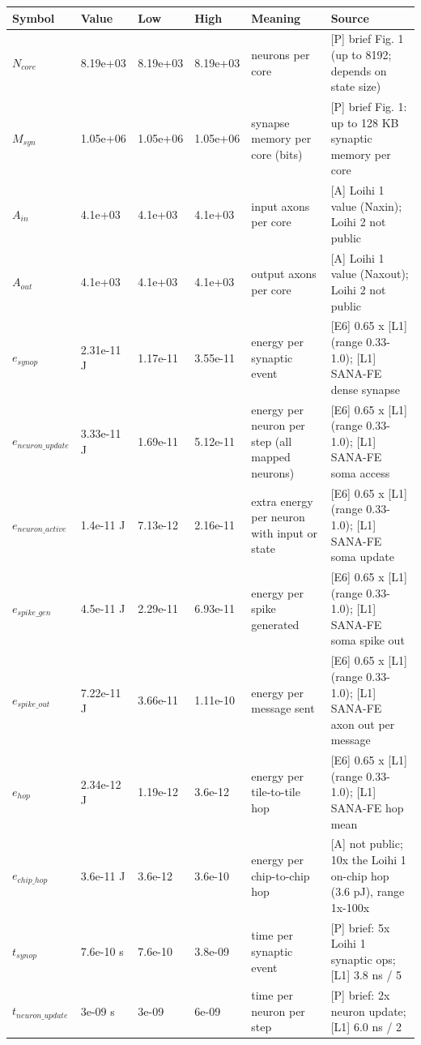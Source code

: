 \begin{tabular}{@{}llllll@{}}
\toprule
Symbol & Value & Low & High & Meaning & Source \\
\midrule
$N_{core}$ & 8.19e+03  & 8.19e+03 & 8.19e+03 & neurons per core & [P] brief Fig. 1 (up to 8192; depends on state size) \\
$M_{syn}$ & 1.05e+06  & 1.05e+06 & 1.05e+06 & synapse memory per core (bits) & [P] brief Fig. 1: up to 128 KB synaptic memory per core \\
$A_{in}$ & 4.1e+03  & 4.1e+03 & 4.1e+03 & input axons per core & [A] Loihi 1 value (Naxin); Loihi 2 not public \\
$A_{out}$ & 4.1e+03  & 4.1e+03 & 4.1e+03 & output axons per core & [A] Loihi 1 value (Naxout); Loihi 2 not public \\
$e_{synop}$ & 2.31e-11 J & 1.17e-11 & 3.55e-11 & energy per synaptic event & [E6] 0.65 x [L1] (range 0.33-1.0); [L1] SANA-FE dense synapse \\
$e_{neuron\_update}$ & 3.33e-11 J & 1.69e-11 & 5.12e-11 & energy per neuron per step (all mapped neurons) & [E6] 0.65 x [L1] (range 0.33-1.0); [L1] SANA-FE soma access \\
$e_{neuron\_active}$ & 1.4e-11 J & 7.13e-12 & 2.16e-11 & extra energy per neuron with input or state & [E6] 0.65 x [L1] (range 0.33-1.0); [L1] SANA-FE soma update \\
$e_{spike\_gen}$ & 4.5e-11 J & 2.29e-11 & 6.93e-11 & energy per spike generated & [E6] 0.65 x [L1] (range 0.33-1.0); [L1] SANA-FE soma spike out \\
$e_{spike\_out}$ & 7.22e-11 J & 3.66e-11 & 1.11e-10 & energy per message sent & [E6] 0.65 x [L1] (range 0.33-1.0); [L1] SANA-FE axon out per message \\
$e_{hop}$ & 2.34e-12 J & 1.19e-12 & 3.6e-12 & energy per tile-to-tile hop & [E6] 0.65 x [L1] (range 0.33-1.0); [L1] SANA-FE hop mean \\
$e_{chip\_hop}$ & 3.6e-11 J & 3.6e-12 & 3.6e-10 & energy per chip-to-chip hop & [A] not public; 10x the Loihi 1 on-chip hop (3.6 pJ), range 1x-100x \\
$t_{synop}$ & 7.6e-10 s & 7.6e-10 & 3.8e-09 & time per synaptic event & [P] brief: 5x Loihi 1 synaptic ops; [L1] 3.8 ns / 5 \\
$t_{neuron\_update}$ & 3e-09 s & 3e-09 & 6e-09 & time per neuron per step & [P] brief: 2x neuron update; [L1] 6.0 ns / 2 \\

\end{tabular}
